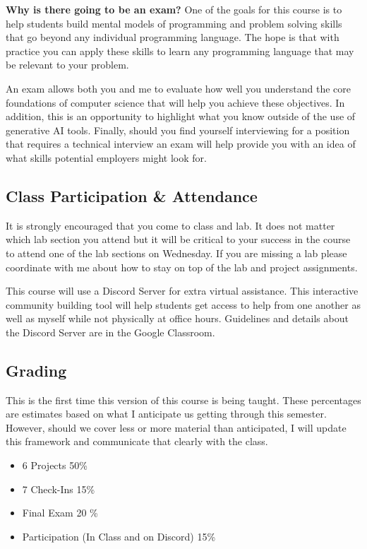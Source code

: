 \documentclass[12pt]{article}
\begin{document}
\textbf{Why is there going to be an exam?}
One of the goals for this course is to help students build mental models of programming and problem solving skills that go beyond any individual programming language.
The hope is that with practice you can apply these skills to learn any programming language that may be relevant to your problem.

An exam allows both you and me to evaluate how well you understand the core foundations of computer science that will help you achieve these objectives.
In addition, this is an opportunity to highlight what you know outside of the use of generative AI tools.
Finally, should you find yourself interviewing for a position that requires a technical interview an exam will help provide you with an idea of what skills potential employers might look for. 

\subsection{Class Participation \& Attendance}
It is strongly encouraged that you come to class and lab.
It does not matter which lab section you attend but it will be critical to your success in the course to attend one of the lab sections on Wednesday.
If you are missing a lab please coordinate with me about how to stay on top of the lab and project assignments. 

This course will use a Discord Server for extra virtual assistance.
This interactive community building tool will help students get access to help from one another as well as myself while not physically at office hours.
Guidelines and details about the Discord Server are in the Google Classroom. 

\subsection{Grading}
This is the first time this version of this course is being taught.
These percentages are estimates based on what I anticipate us getting through this semester.
However, should we cover less or more material than anticipated, I will update this framework and communicate that clearly with the class.

\begin{itemize}
\item 6 Projects  50\%
\item 7 Check-Ins 15\%
\item Final Exam 20 \%
  \item Participation (In Class and on Discord) 15\%
\end{itemize}
\end{document}

